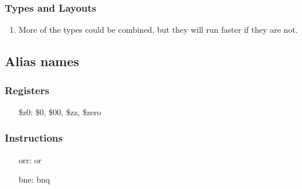\documentclass{article}
\begin{document}
		\subsubsection{Types and Layouts}
			\begin{enumerate}
				\item More of the types could be combined, but they will run faster if they are not.
			\end{enumerate}
	\subsection{Alias names}
		\subsubsection{Registers}
			\begin{itemize}
				\item[\$z0:] \$0, \$00, \$zz, \$zero
			\end{itemize}
		\subsubsection{Instructions}
			\begin{itemize}
				\item[orr:] or
				\item[bne:] bnq
			\end{itemize}
\end{document}
